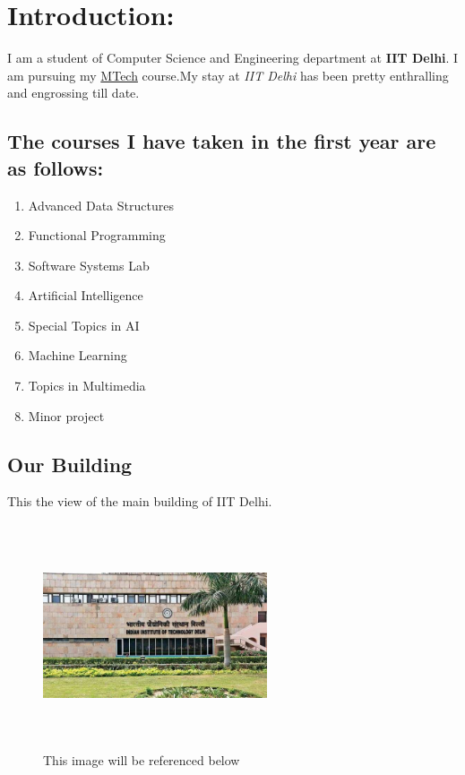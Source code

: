 \documentclass[sigconf]{acmart}
\begin{document}
\section{Introduction:}
\par I am a student of Computer Science and Engineering department at \textbf{IIT Delhi}. I am pursuing my \underline{MTech} course.My stay at \textit{IIT Delhi} has been pretty enthralling and engrossing till date.

\subsection{The courses I have taken in the first year are as follows:}
\begin{enumerate}
	\item Advanced Data Structures
	\item Functional Programming
	\item Software Systems Lab
	\item Artificial Intelligence
	\item Special Topics in AI
	\item Machine Learning
	\item Topics in Multimedia
	\item Minor project
\end{enumerate}

\subsection{Our Building} \label{introduction}
This the view of the main building of IIT Delhi.

\begin{figure}[h]
\includegraphics[width=250,height=250]{iitd.jpg}
\caption{This image will be referenced below}
\label{fig:IITD Building}
\end{figure}
\end{document}
